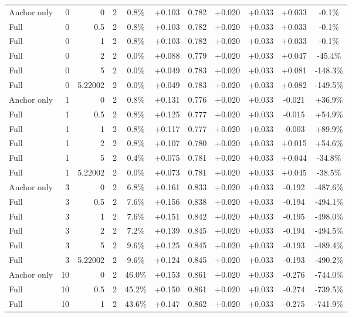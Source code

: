 \begin{table}[htbp]
\begin{tabular}{lrrrccccccc}
Anchor only & 0 & 0 & 2 & 0.8\% & +0.103 & 0.782 & +0.020 & +0.033 & +0.033 & -0.1\% \\
Full & 0 & 0.5 & 2 & 0.8\% & +0.103 & 0.782 & +0.020 & +0.033 & +0.033 & -0.1\% \\
Full & 0 & 1 & 2 & 0.8\% & +0.103 & 0.782 & +0.020 & +0.033 & +0.033 & -0.1\% \\
Full & 0 & 2 & 2 & 0.0\% & +0.088 & 0.779 & +0.020 & +0.033 & +0.047 & -45.4\% \\
Full & 0 & 5 & 2 & 0.0\% & +0.049 & 0.783 & +0.020 & +0.033 & +0.081 & -148.3\% \\
Full & 0 & 5.22002 & 2 & 0.0\% & +0.049 & 0.783 & +0.020 & +0.033 & +0.082 & -149.5\% \\
Anchor only & 1 & 0 & 2 & 0.8\% & +0.131 & 0.776 & +0.020 & +0.033 & -0.021 & +36.9\% \\
Full & 1 & 0.5 & 2 & 0.8\% & +0.125 & 0.777 & +0.020 & +0.033 & -0.015 & +54.9\% \\
Full & 1 & 1 & 2 & 0.8\% & +0.117 & 0.777 & +0.020 & +0.033 & -0.003 & +89.9\% \\
Full & 1 & 2 & 2 & 0.8\% & +0.107 & 0.780 & +0.020 & +0.033 & +0.015 & +54.6\% \\
Full & 1 & 5 & 2 & 0.4\% & +0.075 & 0.781 & +0.020 & +0.033 & +0.044 & -34.8\% \\
Full & 1 & 5.22002 & 2 & 0.0\% & +0.073 & 0.781 & +0.020 & +0.033 & +0.045 & -38.5\% \\
Anchor only & 3 & 0 & 2 & 6.8\% & +0.161 & 0.833 & +0.020 & +0.033 & -0.192 & -487.6\% \\
Full & 3 & 0.5 & 2 & 7.6\% & +0.156 & 0.838 & +0.020 & +0.033 & -0.194 & -494.1\% \\
Full & 3 & 1 & 2 & 7.6\% & +0.151 & 0.842 & +0.020 & +0.033 & -0.195 & -498.0\% \\
Full & 3 & 2 & 2 & 7.2\% & +0.139 & 0.845 & +0.020 & +0.033 & -0.194 & -494.5\% \\
Full & 3 & 5 & 2 & 9.6\% & +0.125 & 0.845 & +0.020 & +0.033 & -0.193 & -489.4\% \\
Full & 3 & 5.22002 & 2 & 9.6\% & +0.124 & 0.845 & +0.020 & +0.033 & -0.193 & -490.2\% \\
Anchor only & 10 & 0 & 2 & 46.0\% & +0.153 & 0.861 & +0.020 & +0.033 & -0.276 & -744.0\% \\
Full & 10 & 0.5 & 2 & 45.2\% & +0.150 & 0.861 & +0.020 & +0.033 & -0.274 & -739.5\% \\
Full & 10 & 1 & 2 & 43.6\% & +0.147 & 0.862 & +0.020 & +0.033 & -0.275 & -741.9\% \\

\end{tabular}
\end{table}
